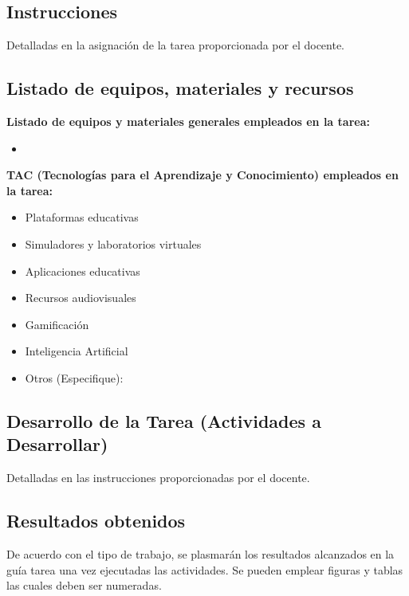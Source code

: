 \documentclass{article}
\begin{document}
\subsection{Instrucciones}

Detalladas en la asignación de la tarea proporcionada por el docente.


\subsection{Listado de equipos, materiales y recursos}
\textbf{Listado de equipos y materiales generales empleados en la tarea:}
\begin{itemize}
    \item  
\end{itemize}

\textbf{TAC (Tecnologías para el Aprendizaje y Conocimiento) empleados en la tarea:}
\begin{itemize}
    \item[$\square$] Plataformas educativas
    \item[$\square$] Simuladores y laboratorios virtuales
    \item[$\square$] Aplicaciones educativas
    \item[$\square$] Recursos audiovisuales
    \item[$\square$] Gamificación
    \item[$\square$] Inteligencia Artificial
    \item Otros (Especifique): \underline{\hspace{5cm}}
\end{itemize}


\subsection{Desarrollo de la Tarea (Actividades a Desarrollar)}

Detalladas en las instrucciones proporcionadas por el docente.

\subsection{Resultados obtenidos}
De acuerdo con el tipo de trabajo, se plasmarán los resultados alcanzados en la guía tarea una vez ejecutadas las actividades. Se pueden emplear figuras y tablas las cuales deben ser numeradas.


\end{document}
